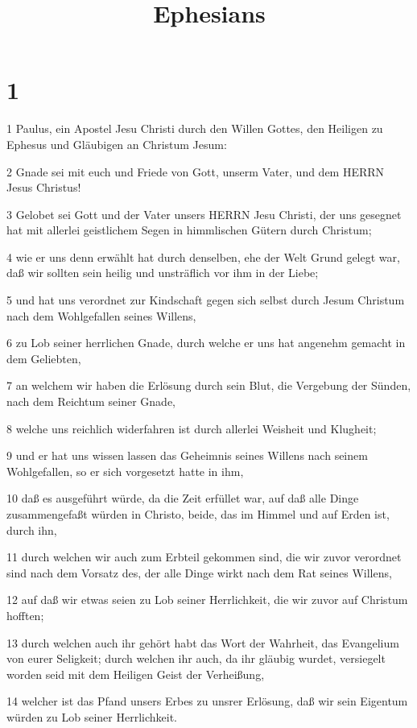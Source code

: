 

\title{Ephesians}


\chapter{1}

\par 1 Paulus, ein Apostel Jesu Christi durch den Willen Gottes, den Heiligen zu Ephesus und Gläubigen an Christum Jesum:
\par 2 Gnade sei mit euch und Friede von Gott, unserm Vater, und dem HERRN Jesus Christus!
\par 3 Gelobet sei Gott und der Vater unsers HERRN Jesu Christi, der uns gesegnet hat mit allerlei geistlichem Segen in himmlischen Gütern durch Christum;
\par 4 wie er uns denn erwählt hat durch denselben, ehe der Welt Grund gelegt war, daß wir sollten sein heilig und unsträflich vor ihm in der Liebe;
\par 5 und hat uns verordnet zur Kindschaft gegen sich selbst durch Jesum Christum nach dem Wohlgefallen seines Willens,
\par 6 zu Lob seiner herrlichen Gnade, durch welche er uns hat angenehm gemacht in dem Geliebten,
\par 7 an welchem wir haben die Erlösung durch sein Blut, die Vergebung der Sünden, nach dem Reichtum seiner Gnade,
\par 8 welche uns reichlich widerfahren ist durch allerlei Weisheit und Klugheit;
\par 9 und er hat uns wissen lassen das Geheimnis seines Willens nach seinem Wohlgefallen, so er sich vorgesetzt hatte in ihm,
\par 10 daß es ausgeführt würde, da die Zeit erfüllet war, auf daß alle Dinge zusammengefaßt würden in Christo, beide, das im Himmel und auf Erden ist, durch ihn,
\par 11 durch welchen wir auch zum Erbteil gekommen sind, die wir zuvor verordnet sind nach dem Vorsatz des, der alle Dinge wirkt nach dem Rat seines Willens,
\par 12 auf daß wir etwas seien zu Lob seiner Herrlichkeit, die wir zuvor auf Christum hofften;
\par 13 durch welchen auch ihr gehört habt das Wort der Wahrheit, das Evangelium von eurer Seligkeit; durch welchen ihr auch, da ihr gläubig wurdet, versiegelt worden seid mit dem Heiligen Geist der Verheißung,
\par 14 welcher ist das Pfand unsers Erbes zu unsrer Erlösung, daß wir sein Eigentum würden zu Lob seiner Herrlichkeit.
